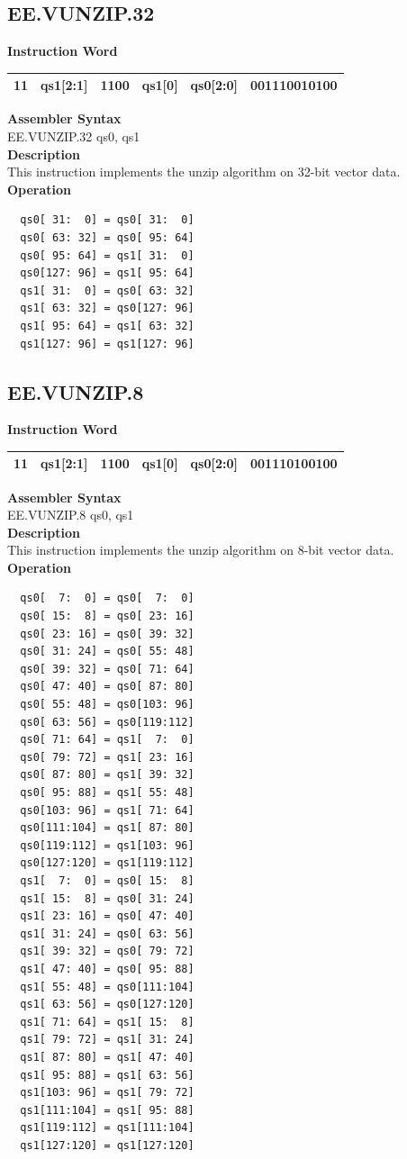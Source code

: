 \clearpage
\subsection{EE.VUNZIP.32}\label{instruction:EEVUNZIP32}
\setlength\tabcolsep{6pt}
\textbf{Instruction Word} \\
\begin{tabular}{|c|c|c|c|c|c|}
	\hline
	11 & qs1[2:1] & 1100 & qs1[0] & qs0[2:0] & 001110010100 \\
	\hline
\end{tabular}

\textbf{Assembler Syntax} \\
EE.VUNZIP.32 qs0, qs1 \\
\textbf{Description} \\
This instruction implements the unzip algorithm on 32-bit vector data.\\
\textbf{Operation}
\begin{lstlisting}
  qs0[ 31:  0] = qs0[ 31:  0]
  qs0[ 63: 32] = qs0[ 95: 64]
  qs0[ 95: 64] = qs1[ 31:  0]
  qs0[127: 96] = qs1[ 95: 64]
  qs1[ 31:  0] = qs0[ 63: 32]
  qs1[ 63: 32] = qs0[127: 96]
  qs1[ 95: 64] = qs1[ 63: 32]
  qs1[127: 96] = qs1[127: 96]
\end{lstlisting}

\clearpage
\subsection{EE.VUNZIP.8}\label{instruction:EEVUNZIP8}
\setlength\tabcolsep{6pt}
\textbf{Instruction Word} \\
\begin{tabular}{|c|c|c|c|c|c|}
	\hline
	11 & qs1[2:1] & 1100 & qs1[0] & qs0[2:0] & 001110100100 \\
	\hline
\end{tabular}

\textbf{Assembler Syntax} \\
EE.VUNZIP.8 qs0, qs1 \\
\textbf{Description} \\
This instruction implements the unzip algorithm on 8-bit vector data.\\
\textbf{Operation}
\begin{lstlisting}
  qs0[  7:  0] = qs0[  7:  0]
  qs0[ 15:  8] = qs0[ 23: 16]
  qs0[ 23: 16] = qs0[ 39: 32]
  qs0[ 31: 24] = qs0[ 55: 48]
  qs0[ 39: 32] = qs0[ 71: 64]
  qs0[ 47: 40] = qs0[ 87: 80]
  qs0[ 55: 48] = qs0[103: 96]
  qs0[ 63: 56] = qs0[119:112]
  qs0[ 71: 64] = qs1[  7:  0]
  qs0[ 79: 72] = qs1[ 23: 16]
  qs0[ 87: 80] = qs1[ 39: 32]
  qs0[ 95: 88] = qs1[ 55: 48]
  qs0[103: 96] = qs1[ 71: 64]
  qs0[111:104] = qs1[ 87: 80]
  qs0[119:112] = qs1[103: 96]
  qs0[127:120] = qs1[119:112]
  qs1[  7:  0] = qs0[ 15:  8]
  qs1[ 15:  8] = qs0[ 31: 24]
  qs1[ 23: 16] = qs0[ 47: 40]
  qs1[ 31: 24] = qs0[ 63: 56]
  qs1[ 39: 32] = qs0[ 79: 72]
  qs1[ 47: 40] = qs0[ 95: 88]
  qs1[ 55: 48] = qs0[111:104]
  qs1[ 63: 56] = qs0[127:120]
  qs1[ 71: 64] = qs1[ 15:  8]
  qs1[ 79: 72] = qs1[ 31: 24]
  qs1[ 87: 80] = qs1[ 47: 40]
  qs1[ 95: 88] = qs1[ 63: 56]
  qs1[103: 96] = qs1[ 79: 72]
  qs1[111:104] = qs1[ 95: 88]
  qs1[119:112] = qs1[111:104]
  qs1[127:120] = qs1[127:120]
\end{lstlisting}

